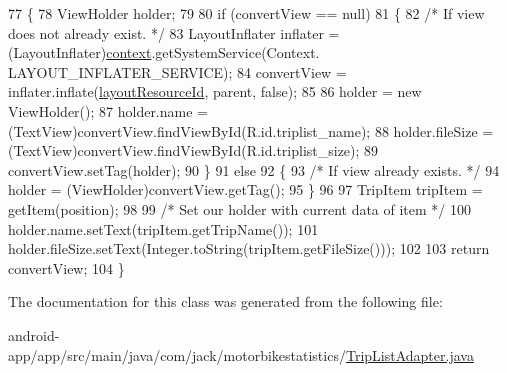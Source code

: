 \begin{DoxyCode}
77                                                                           \{
78         ViewHolder holder;
79 
80         \textcolor{keywordflow}{if} (convertView == null)
81         \{
82             \textcolor{comment}{/* If view does not already exist. */}
83             LayoutInflater inflater = (LayoutInflater)\hyperlink{class_android_app_1_1_trip_list_adapter_a14fa25bc6de0af86497d0cce3e0bdc1b}{context}.getSystemService(Context.
      LAYOUT\_INFLATER\_SERVICE);
84             convertView = inflater.inflate(\hyperlink{class_android_app_1_1_trip_list_adapter_a57cb58f32f3b9ea25c6330a821cb8455}{layoutResourceId}, parent, \textcolor{keyword}{false});
85 
86             holder = \textcolor{keyword}{new} ViewHolder();
87             holder.name = (TextView)convertView.findViewById(R.id.triplist\_name);
88             holder.fileSize = (TextView)convertView.findViewById(R.id.triplist\_size);
89             convertView.setTag(holder);
90         \}
91         \textcolor{keywordflow}{else}
92         \{
93             \textcolor{comment}{/* If view already exists. */}
94             holder = (ViewHolder)convertView.getTag();
95         \}
96 
97         TripItem tripItem = getItem(position);
98 
99         \textcolor{comment}{/* Set our holder with current data of item */}
100         holder.name.setText(tripItem.getTripName());
101         holder.fileSize.setText(Integer.toString(tripItem.getFileSize()));
102 
103         \textcolor{keywordflow}{return} convertView;
104     \}
\end{DoxyCode}


The documentation for this class was generated from the following file\+:\begin{DoxyCompactItemize}
\item 
android-\/app/app/src/main/java/com/jack/motorbikestatistics/\hyperlink{_trip_list_adapter_8java}{Trip\+List\+Adapter.\+java}\end{DoxyCompactItemize}
